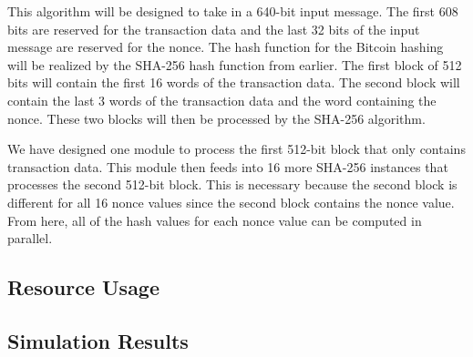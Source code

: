\documentclass{article}
\begin{document}
This algorithm will be designed to take in a 640-bit input message. The first 608 bits are reserved for the transaction data and the last 32 bits of the input message are reserved for the nonce. The hash function for the Bitcoin hashing will be realized by the SHA-256 hash function from earlier. The first block of 512 bits will contain the first 16 words of the transaction data. The second block will contain the last 3 words of the transaction data and the word containing the nonce. These two blocks will then be processed by the SHA-256 algorithm.

We have designed one module to process the first 512-bit block that only contains transaction data. This module then feeds into 16 more SHA-256 instances that processes the second 512-bit block. This is necessary because the second block is different for all 16 nonce values since the second block contains the nonce value. From here, all of the hash values for each nonce value can be computed in parallel.


\subsection{Resource Usage}


\subsection{Simulation Results}



\label{LastPage}
\end{document}
